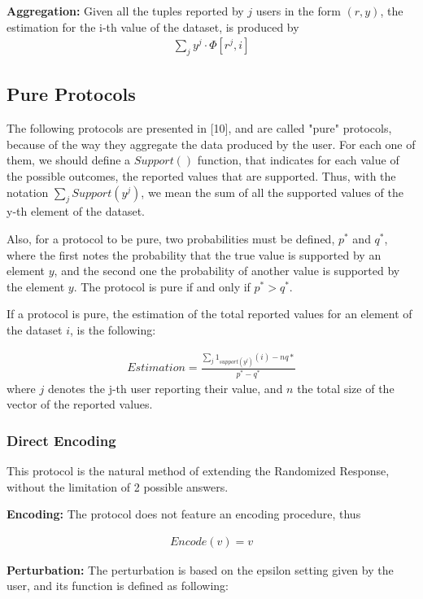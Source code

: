 \textbf{Aggregation:} Given all the tuples reported by $j$ users in the form $(r, y)$, the estimation for the i-th value of the dataset, is produced by 
\begin{align*}
\sum_{j} y^j \cdot \Phi[r^j,i]
\end{align*}

\subsection{Pure Protocols}

The following protocols are presented in [10], and are called "pure" protocols, because of the way they aggregate the data produced by the user. For each one of them, we should define a $Support()$ function, that indicates for each value of the possible outcomes, the reported values that are supported. Thus, with the notation $\sum_{j} Support(y^j)$, we mean the sum of all the supported values of the y-th element of the dataset.

Also, for a protocol to be pure, two probabilities must be defined, $p^*$ and $q^*$, where the first notes the probability that the true value is supported by an element $y$, and the second one the probability of another value is supported by the element $y$. The protocol is pure if and only if $p^* > q^*$.

If a protocol is pure, the estimation of the total reported values for an element of the dataset $i$, is the following:

\begin{align}
    Estimation = \frac{\sum_{j} 1_{support(y^j)}(i) - nq*}{p^* - q^*}
\end{align}
where $j$ denotes the j-th user reporting their value, and $n$ the total size of the vector of the reported values.


\subsubsection{Direct Encoding}

This protocol is the natural method of extending the Randomized Response, without the limitation of 2 possible answers. 

\textbf{Encoding:} The protocol does not feature an encoding procedure, thus 

\begin{align*}
    Encode(v) = v
\end{align*}

\textbf{Perturbation:} The perturbation is based on the epsilon setting given by the user, and its function is defined as following:

